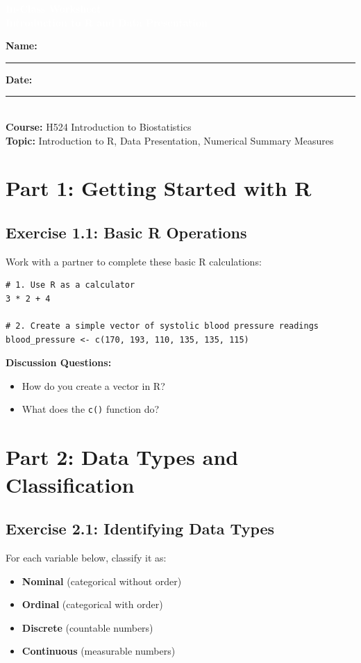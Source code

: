 \documentclass[11pt]{article}
\title{}
\author{}
\date{}
\begin{document}
\begin{tcolorbox}[colback=osaorange,colframe=black,boxrule=2pt,arc=0pt,left=6pt,right=6pt,top=10pt,bottom=10pt]
\centering
\textcolor{white}{\textbf{\Large In-Class Worksheet}}\\
\textcolor{white}{\textbf{\large Introduction to R and Data Presentation}}
\end{tcolorbox}

\vspace{8pt}

\noindent\textbf{Name:} \rule{8cm}{0.4pt} \hfill \textbf{Date:} \rule{4cm}{0.4pt}\\[0.5ex]
\textbf{Course:} H524 Introduction to Biostatistics\\
\textbf{Topic:} Introduction to R, Data Presentation, Numerical Summary Measures

\vspace{8pt}

\section{Part 1: Getting Started with R}

\subsection{Exercise 1.1: Basic R Operations}
Work with a partner to complete these basic R calculations:

\begin{lstlisting}
# 1. Use R as a calculator
3 * 2 + 4

# 2. Create a simple vector of systolic blood pressure readings
blood_pressure <- c(170, 193, 110, 135, 135, 115)
\end{lstlisting}

\textbf{Discussion Questions:}
\begin{itemize}
\item How do you create a vector in R?
\item What does the \texttt{c()} function do?
\end{itemize}

\section{Part 2: Data Types and Classification}

\subsection{Exercise 2.1: Identifying Data Types}
For each variable below, classify it as:
\begin{itemize}
\item \textbf{Nominal} (categorical without order)
\item \textbf{Ordinal} (categorical with order)
\item \textbf{Discrete} (countable numbers)
\item \textbf{Continuous} (measurable numbers)
\end{itemize}
\end{document}
